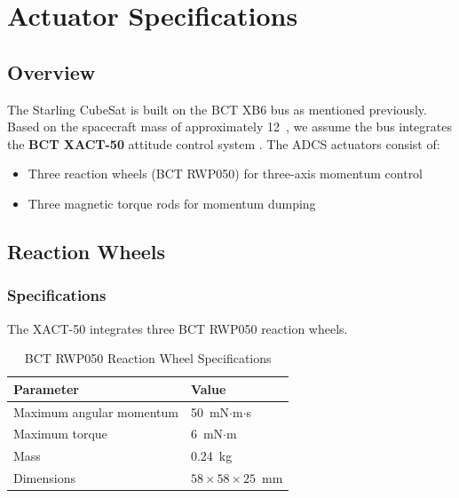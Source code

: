 \section{Actuator Specifications}
\label{sec:actuators}

\subsection{Overview}

The Starling CubeSat is built on the BCT XB6 bus as mentioned previously. Based on the spacecraft mass of approximately 12~, we
assume the bus integrates the \textbf{BCT XACT-50} attitude control system
\cite{BCT_HEGEL2018, BCT_ADCS2026}.
The ADCS actuators consist of:
\begin{itemize}
    \item Three reaction wheels (BCT RWP050) for three-axis momentum control
    \item Three magnetic torque rods for momentum dumping
\end{itemize}

\subsection{Reaction Wheels}

\subsubsection{Specifications}

The XACT-50 integrates three BCT RWP050 reaction wheels.

\begin{table}[H]
\centering
\caption{BCT RWP050 Reaction Wheel Specifications \cite{BCT_HEGEL2018, BCT_ADCS2026}}
\label{tab:rw_specs}
\begin{tabular}{ll}
\hline
\textbf{Parameter} & \textbf{Value} \\
\hline
Maximum angular momentum & 50~mN$\cdot$m$\cdot$s \\
Maximum torque           & 6~mN$\cdot$m \\
Mass                     & 0.24~kg \\
Dimensions               & $58 \times 58 \times 25$~mm \\
\hline
\end{tabular}
\end{table}

